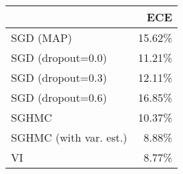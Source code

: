 \begin{tabular}{lr}
\toprule
{} &    ECE \\
\midrule
SGD (MAP)              & 15.62\% \\
SGD (dropout=0.0)      & 11.21\% \\
SGD (dropout=0.3)      & 12.11\% \\
SGD (dropout=0.6)      & 16.85\% \\
SGHMC                  & 10.37\% \\
SGHMC (with var. est.) &  8.88\% \\
VI                     &  8.77\% \\
\bottomrule
\end{tabular}
